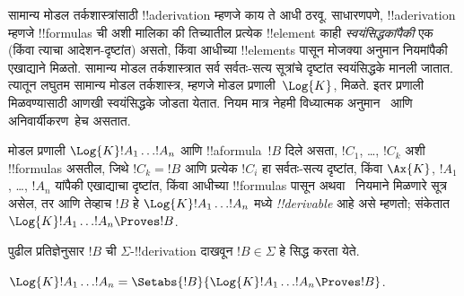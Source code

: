 \documentclass[../../../include/open-logic-section]{subfiles}
\begin{document}


सामान्य मोडल तर्कशास्त्रांसाठी !!a{derivation}
म्हणजे काय ते आधी ठरवू. साधारणपणे,
!!a{derivation} म्हणजे !!{formula}s ची अशी मालिका
की तिच्यातील प्रत्येक !!{element} काही
\emph{स्वयंसिद्धकांपैकी} एक (किंवा त्याचा आदेशन-दृष्टांत)
असतो, किंवा आधीच्या !!{element}s पासून मोजक्या
अनुमान नियमांपैकी एखाद्याने मिळतो. सामान्य मोडल
तर्कशास्त्रात सर्व सर्वतः-सत्य सूत्रांचे दृष्टांत
स्वयंसिद्धके मानली जातात. त्यातून लघुतम सामान्य
मोडल तर्कशास्त्र, म्हणजे मोडल प्रणाली~$\Log{K}$,
मिळते. इतर प्रणाली मिळवण्यासाठी आणखी स्वयंसिद्धके
जोडता येतात. नियम मात्र नेहमी विध्यात्मक अनुमान~\MP{}
आणि अनिवार्यीकरण~\Nec हेच असतात.

\begin{defn}
  मोडल प्रणाली $\Log{K} !A_1 \dots !A_n$ आणि
  !!a{formula}~$!B$ दिले असता, $!C_1$, \dots,
  $!C_k$ अशी !!{formula}s असतील, जिथे $!C_k = !B$
  आणि प्रत्येक $!C_i$ हा सर्वतः-सत्य दृष्टांत,
  किंवा $\Ax{K}$,
  $!A_1$, \dots, $!A_n$ यांपैकी एखाद्याचा दृष्टांत,
  किंवा आधीच्या !!{formula}s पासून \MP{} अथवा~\Nec
  नियमाने मिळणारे सूत्र असेल, तर आणि तेव्हाच
  $!B$ हे $\Log{K} !A_1 \dots
  !A_n$ मध्ये \emph{!!{derivable}} आहे असे म्हणतो;
  संकेतात $\Log{K} !A_1 \dots !A_n \Proves !B$.
\end{defn}

पुढील प्रतिज्ञेनुसार $!B$ ची $\Sigma$-!!{derivation}
दाखवून $!B \in \Sigma$ हे सिद्ध करता येते.

\begin{prop}
  $\Log{K} !A_1 \dots !A_n = \Setabs{!B}{\Log{K} !A_1 \dots !A_n \Proves !B}$.
\end{prop}
\end{document}
